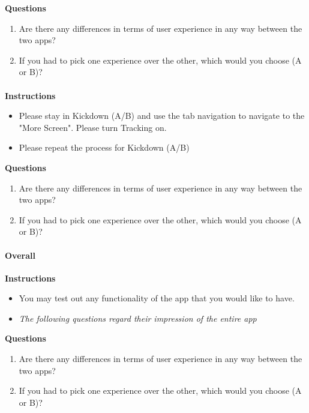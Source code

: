 \textbf{Questions}
\begin{enumerate}
    \item Are there any differences in terms of user experience in any way between the two apps?
    \item If you had to pick one experience over the other, which would you choose (A or B)?
\end{enumerate}

\paragraph*{    }\hfill \break
\textbf{Instructions}
\begin{itemize}
    \item Please stay in Kickdown (A/B) and use the tab navigation to navigate to the "More Screen". Please turn Tracking on.
    \item Please repeat the process for Kickdown (A/B)
\end{itemize}

\textbf{Questions}
\begin{enumerate}
    \item Are there any differences in terms of user experience in any way between the two apps?
    \item If you had to pick one experience over the other, which would you choose (A or B)?
\end{enumerate}


\paragraph*{Overall}\hfill \break
\textbf{Instructions}
\begin{itemize}
    \item You may test out any functionality of the app that you would like to have.
    \item \textit{The following questions regard their impression of the entire app}
\end{itemize}

\textbf{Questions}
\begin{enumerate}
    \item Are there any differences in terms of user experience in any way between the two apps?
    \item If you had to pick one experience over the other, which would you choose (A or B)?
\end{enumerate}